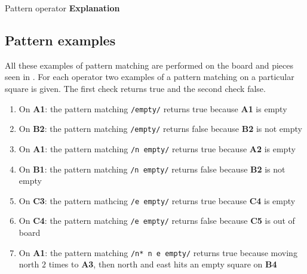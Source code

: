          {Pattern operator                       }{\textbf{Explanation}}{
}

\subsection{Pattern examples}
\label{sec:patternexamples}
All these examples of pattern matching are performed on the board and pieces
seen in . For each operator two examples of a pattern
matching on a particular square is given. The first check returns true and the
second check false.

\begin{enumerate}[noitemsep]
  \item On \textbf{A1}: the pattern matching \texttt{/empty/} returns true because
    \textbf{A1} is empty
  \item On \textbf{B2}: the pattern matching \texttt{/empty/} returns false because
    \textbf{B2} is not empty
  \item On \textbf{A1}: the pattern matching \texttt{/n empty/} returns true
    because \textbf{A2} is empty
  \item On \textbf{B1}: the pattern matching \texttt{/n empty/} returns false
    because \textbf{B2} is not empty
  \item On \textbf{C3}: the pattern mathcing \texttt{/e empty/} returns true
    because \textbf{C4} is empty
  \item On \textbf{C4}: the pattern matching \texttt{/e empty/} returns false
    because \textbf{C5} is out of board
  \item On \textbf{A1}: the pattern matching \texttt{/n* n e empty/}
  returns true because moving north $2$ times to \textbf{A3}, then north
  and east hits an empty square on \textbf{B4}
\end{enumerate}

